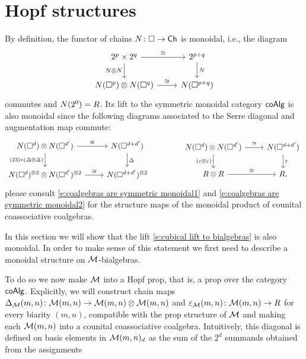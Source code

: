 
\section{Hopf structures}

By definition, the functor of chains $N \colon \square \to \mathsf{Ch}$ is monoidal, i.e., the diagram
\begin{equation*}
\begin{tikzcd}
2^p \times 2^q \arrow[r, "\cong"] \arrow[d, "\cchains \otimes \cchains"']& 2^{p+q} \arrow[d, "\cchains"] \\
\cchains(\cube^p) \otimes \cchains(\cube^q) \arrow[r, "\cong"] & \cchains(\cube^{p+q})
\end{tikzcd}
\end{equation*}
commutes and $N(2^0) = R$.
Its lift to the symmetric monoidal category $\mathsf{coAlg}$ is also monoidal since the following diagrams associated to the Serre diagonal and augmentation map commute:
\begin{equation*}
\begin{tikzcd}
\cchains(\cube^d) \otimes \cchains(\cube^{d^\prime}) \arrow[r, "\cong"] \arrow[d, "(23) \circ (\Delta \otimes \Delta)"'] & \cchains(\cube^{d+d^\prime}) \arrow[d, "\Delta"]\\
\cchains(\cube^d)^{\otimes 2} \otimes \cchains(\cube^{d^\prime})^{\otimes 2} \arrow[r, "\cong"]& \cchains(\cube^{d+d^\prime})^{\otimes 2}
\end{tikzcd}
\qquad \qquad
\begin{tikzcd}
\cchains(\cube^d) \otimes \cchains(\cube^{d^\prime}) \arrow[r, "\cong"] \arrow[d, "(\varepsilon \otimes \varepsilon)"'] & \cchains(\cube^{d+d^\prime}) \arrow[d, "\varepsilon"] \\
R \otimes R \arrow[r, "\cong"] & R,
\end{tikzcd}
\end{equation*}
please consult \eqref{e:coalgebras are symmetric monoidal1} and \eqref{e:coalgebras are symmetric monoidal2} for the structure maps of the monoidal product of counital coassociative coalgebras.

In this section we will show that the lift \eqref{e:cubical lift to bialgebras} is also monoidal.
In order to make sense of this statement we first need to describe a monoidal structure on $\mathcal{M}$-bialgebras.

To do so we now make $\mathcal{M}$ into a Hopf prop, that is, a prop over the category $\mathsf{coAlg}$.
Explicitly, we will construct chain maps $\Delta_{\mathcal{M}}(m,n) \colon \mathcal{M}(m,n) \to \mathcal{M}(m,n) \otimes \mathcal{M}(m,n)$ and $\varepsilon_{\mathcal{M}}(m,n) \colon \mathcal{M}(m,n) \to R$ for every biarity $(m,n)$, compatible with the prop structure of $\mathcal{M}$ and making each $\mathcal{M}(m,n)$ into a counital coassociative coalgebra.
Intuitively, this diagonal is defined on basis elements in $\mathcal{M}(m,n)_d$ as the sum of the $2^d$ summands obtained from the assignments 

